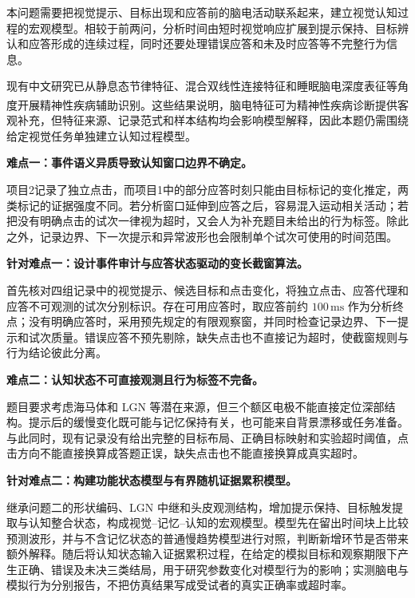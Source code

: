 \documentclass[a4paper,zihao=-4,linespread=1]{ctexart}
\numberwithin{figure}{section}       %
\newcommand{\upcite}[1]{\textsuperscript{\cite{#1}}} %
\begin{document}
本问题需要把视觉提示、目标出现和应答前的脑电活动联系起来，建立视觉认知过程的宏观模型。相较于前两问，分析时间由短时视觉响应扩展到提示保持、目标辨认和应答形成的连续过程，同时还要处理错误应答和未及时应答等不完整行为信息。

现有中文研究已从静息态节律特征、混合双线性连接特征和睡眠脑电深度表征等角度开展精神性疾病辅助识别\upcite{lai2019classification,jia2024depression,tao2023sleep}。这些结果说明，脑电特征可为精神性疾病诊断提供客观补充，但特征来源、记录范式和样本结构均会影响模型解释，因此本题仍需围绕给定视觉任务单独建立认知过程模型。

\noindent\textbf{难点一：事件语义异质导致认知窗口边界不确定。}

项目2记录了独立点击，而项目1中的部分应答时刻只能由目标标记的变化推定，两类标记的证据强度不同。若分析窗口延伸到应答之后，容易混入运动相关活动；若把没有明确点击的试次一律视为超时，又会人为补充题目未给出的行为标签。除此之外，记录边界、下一次提示和异常波形也会限制单个试次可使用的时间范围。

\noindent\textbf{针对难点一：设计事件审计与应答状态驱动的变长截窗算法。}

首先核对四组记录中的视觉提示、候选目标和点击变化，将独立点击、应答代理和应答不可观测的试次分别标识。存在可用应答时，取应答前约 \(100\,\mathrm{ms}\) 作为分析终点；没有明确应答时，采用预先规定的有限观察窗，并同时检查记录边界、下一提示和试次质量。错误应答不预先剔除，缺失点击也不直接记为超时，使截窗规则与行为结论彼此分离。

\noindent\textbf{难点二：认知状态不可直接观测且行为标签不完备。}

题目要求考虑海马体和 LGN 等潜在来源，但三个额区电极不能直接定位深部结构。提示后的缓慢变化既可能与记忆保持有关，也可能来自背景漂移或任务准备。与此同时，现有记录没有给出完整的目标布局、正确目标映射和实验超时阈值，点击方向不能直接换算成答题正误，缺失点击也不能直接换算成真实超时。

\noindent\textbf{针对难点二：构建功能状态模型与有界随机证据累积模型。}

继承问题二的形状编码、LGN 中继和头皮观测结构，增加提示保持、目标触发提取与认知整合状态，构成视觉--记忆--认知的宏观模型。模型先在留出时间块上比较预测波形，并与不含记忆状态的普通慢趋势模型进行对照，判断新增环节是否带来额外解释。随后将认知状态输入证据累积过程，在给定的模拟目标和观察期限下产生正确、错误及未决三类结局，用于研究参数变化对模型行为的影响；实测脑电与模拟行为分别报告，不把仿真结果写成受试者的真实正确率或超时率。


\newpage
\end{document}
